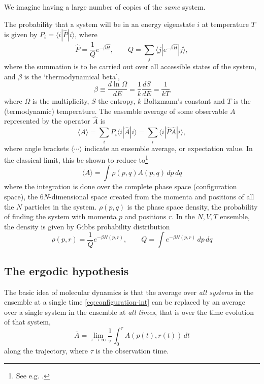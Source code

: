 \documentclass[11pt,bibliography=totoc,index=totoc]{scrbook}   %
\begin{document}
We imagine having a large number of copies of the \emph{same} system. 


The probability that a system will be in an energy eigenstate $i$ at temperature $T$ is 
given by $P_i=\langle i | \hat{P} | i \rangle$, where
\begin{equation}
  \hat{P} = \frac{1}{Q} e^{-\beta\hat{H}}, \qquad Q = \sum_j \langle j | e^{-\beta\hat{H}} | j \rangle,
\end{equation}
where the summation is to be carried out over all accessible states of the system, and
$\beta$ is the `thermodynamical beta',
\begin{equation}
  \beta \equiv \frac{d\ln\Omega}{dE} = \frac{1}{k}\frac{dS}{dE} = \frac{1}{kT}
\end{equation}
where $\Omega$ is the multiplicity, $S$ the entropy, $k$ Boltzmann's constant and $T$ is the (termodynamic) temperature. 
The ensemble average of some observable $A$ represented by the operator $\hat{A}$ is
\begin{equation}
  \langle A \rangle = \sum_i P_i \langle i | \hat{A} | i\rangle = \sum_i \langle i | \hat{P} \hat{A} | i \rangle,
\end{equation}
where angle brackets $\langle \cdots \rangle$ indicate an ensemble average, or expectation value.
In the classical limit, this be shown to reduce to\footnote{See e.g. \cite[13-15]{Frenkel:1996}.}
\begin{equation}
  \langle A \rangle = \int \rho(p,q) A(p,q)\,dp\,dq 
  \label{eq:configuration-int}
\end{equation}
where the integration is done over the complete phase space (configuration space), the $6N$-dimensional space created from the momenta and positions of all the $N$ particles in the system. $\rho(p,q)$ is the phase space density, the probability of finding the system with momenta $p$ and positions $r$. In the $N,V,T$ ensemble, the density is given by Gibbs probability distribution
\begin{equation}
  \rho(p,r) = \frac{1}{Q} e^{-\beta H(p,r)},\qquad Q = \int e^{-\beta H(p,r)} \,dp\,dq
\end{equation}

\subsection{The ergodic hypothesis}

The basic idea of molecular dynamics is that the average over \emph{all systems} in the ensemble at a single time \eqref{eq:configuration-int} can be replaced by an average over a single system in the ensemble at \emph{all times}, that is over the time evolution of that system,
\begin{equation}
  \bar{A} = \lim_{\tau\to\infty} \frac{1}{\tau}\int_{0}^{\tau} A(p(t),r(t)) \,dt
  \label{eq:time-integral}
\end{equation}
along the trajectory, where $\tau$ is the observation time. 
\end{document}
